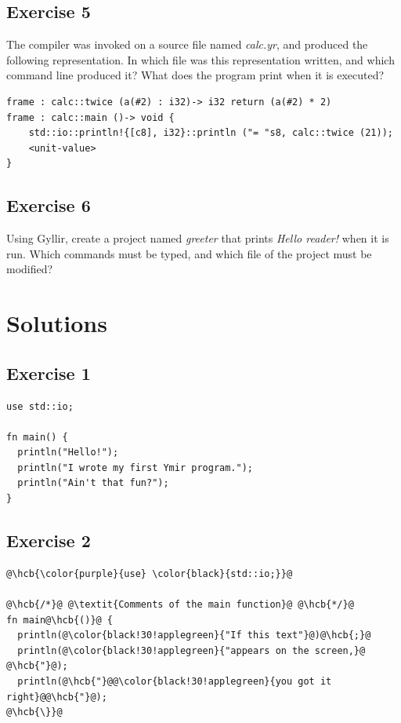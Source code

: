 \subsection*{Exercise 5}

The compiler was invoked on a source file named \textit{calc.yr}, and produced
the following representation. In which file was this representation written, and
which command line produced it? What does the program print when it is executed?

\begin{lstlisting}[style=myilVerb]
frame : calc::twice (a(#2) : i32)-> i32 return (a(#2) * 2)
frame : calc::main ()-> void {
    std::io::println!{[c8], i32}::println ("= "s8, calc::twice (21));
    <unit-value>
}
\end{lstlisting}

\subsection*{Exercise 6}

Using Gyllir, create a project named \textit{greeter} that prints
\textit{Hello reader!} when it is run. Which commands must be typed, and which
file of the project must be modified?

\vfill%
\pagebreak

\forceevenpage{}

\section*{Solutions}
%
\subsection*{Exercise 1}

\begin{lstlisting}[style=coloredverbatim, caption=Solution for exercise 1]
use std::io;

fn main() {
  println("Hello!");
  println("I wrote my first Ymir program.");
  println("Ain't that fun?");
}
\end{lstlisting}

\subsection*{Exercise 2}

\begin{lstlisting}[style=coloredverbatim, escapechar=@]
@\hcb{\color{purple}{use} \color{black}{std::io;}}@

@\hcb{/*}@ @\textit{Comments of the main function}@ @\hcb{*/}@
fn main@\hcb{()}@ {
  println(@\color{black!30!applegreen}{"If this text"}@)@\hcb{;}@
  println(@\color{black!30!applegreen}{"appears on the screen,}@ @\hcb{"}@);
  println(@\hcb{"}@@\color{black!30!applegreen}{you got it right}@@\hcb{"}@);
@\hcb{\}}@
\end{lstlisting}

